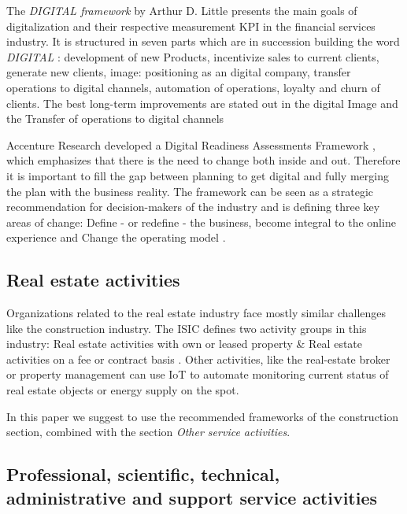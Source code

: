 The \emph{DIGITAL framework} by Arthur D. Little \cite[]{ArthurDLittle-FinancialService} presents the main goals of digitalization and their respective measurement \ac{KPI} in the financial services industry. It is structured in seven parts which are in succession building the word \emph{DIGITAL} \cite{ArthurDLittle-FinancialService}: development of new Products, incentivize sales to current clients, generate new clients, image: positioning as an digital company, transfer operations to digital channels, automation of operations, loyalty and churn of clients. The best long-term improvements are stated out in the digital Image and the Transfer of operations to digital channels \cite{ArthurDLittle-FinancialService}

Accenture Research developed a Digital Readiness Assessments Framework \cite{accenture-europeanFinancialServices-digitalReadinessReport}, which emphasizes that there is the need to change both inside and out. Therefore it is important to fill the gap between planning to get digital and fully merging the plan with the business reality. The framework can be seen as a strategic recommendation for decision-makers of the industry and is defining three key areas of change: Define - or redefine - the business, become integral to the online experience and Change the operating model \cite{accenture-europeanFinancialServices-digitalReadinessReport}. 

\subsection{Real estate activities}

Organizations related to the real estate industry face mostly similar challenges like the construction industry.
The \ac{ISIC} defines two activity groups in this industry: Real estate activities with own or leased property \& Real estate activities on a fee or contract basis \cite{ISIC:2008}. Other activities, like the real-estate broker or property management can use \ac{IoT} to automate monitoring current status of real estate objects or energy supply on the spot. 

In this paper we suggest to use the recommended frameworks of the construction section, combined with the section \emph{Other service activities}. 

\subsection{Professional, scientific, technical, administrative and support service activities}
\label{subsec:profscience}

